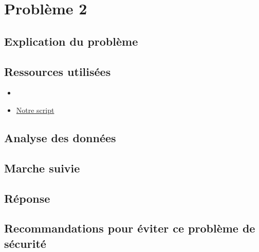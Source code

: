 \section{Problème 2}

\subsection{Explication du problème}

\subsection{Ressources utilisées}

\begin{itemize}
    \item 
    \item \href{}{Notre script}
\end{itemize}

\subsection{Analyse des données}

\subsection{Marche suivie}

\subsection{Réponse}

\subsection{Recommandations pour éviter ce problème de sécurité}
